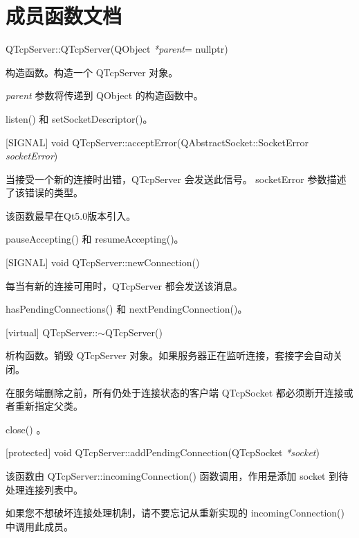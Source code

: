 \section{成员函数文档}

QTcpServer::QTcpServer(QObject  \emph{*parent}= nullptr)

构造函数。构造一个 QTcpServer 对象。

\emph{parent} 参数将传递到 QObject 的构造函数中。

\begin{seeAlso}
listen() 和 setSocketDescriptor()。
\end{seeAlso}



[SIGNAL] void QTcpServer::acceptError(QAbstractSocket::SocketError \emph{socketError})

当接受一个新的连接时出错，QTcpServer 会发送此信号。 socketError 参数描述了该错误的类型。

该函数最早在Qt5.0版本引入。

\begin{seeAlso}
pauseAccepting() 和 resumeAccepting()。
\end{seeAlso}

[SIGNAL] void QTcpServer::newConnection()

每当有新的连接可用时，QTcpServer 都会发送该消息。

\begin{seeAlso}
hasPendingConnections() 和 nextPendingConnection()。
\end{seeAlso}

[virtual] QTcpServer::$\sim$QTcpServer()

析构函数。销毁 QTcpServer 对象。如果服务器正在监听连接，套接字会自动关闭。

在服务端删除之前，所有仍处于连接状态的客户端 QTcpSocket 都必须断开连接或者重新指定父类。

\begin{seeAlso}
 close() 。
\end{seeAlso}


[protected] void QTcpServer::addPendingConnection(QTcpSocket  \emph{*socket})

该函数由 QTcpServer::incomingConnection() 函数调用，作用是添加 socket 到待处理连接列表中。

\begin{notice}
如果您不想破坏连接处理机制，请不要忘记从重新实现的 incomingConnection() 中调用此成员。
\end{notice}

